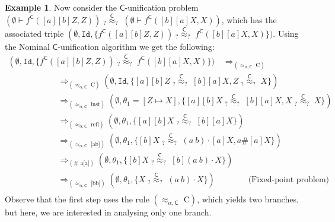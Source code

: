 \documentclass[11pt,a4paper]{amsart}
\newcommand{\caleq}{\approx_{\alpha,\theory{C}}}
\newcommand{\theory}[1]{\ensuremath{\mathsf{#1}}}
\theoremstyle{plain}
\theoremstyle{definition}
\newtheorem{example}{Example}[section]
\theoremstyle{remark}
\begin{document}
\begin{example}
Now consider the \theory{C}-unification problem 
$(\emptyset\vdash f^\theory{C}([a][b]Z,Z)) \; _?{\overset{\theory{C}}{\approx}}_? \; (\emptyset\vdash  f^\theory{C}([b][a]X,X))$,
which has the associated triple $(\emptyset, \mathtt{Id}, \{f^\theory{C}([a][b]Z,Z)) \; _?{\overset{\theory{C}}{\approx}}_? \; f^\theory{C}([b][a]X,X)\})$. 
Using the Nominal \theory{C}-unification algorithm we get the following:
{\small
$$
\begin{array}{l}
    (\emptyset, \mathtt{Id}, \{f^\theory{C}([a][b]Z,Z)) \; _?{\overset{\theory{C}}{\approx}}_? \; f^\theory{C}([b][a]X,X)\}) \quad \Longrightarrow_{(\caleq \text{\ C})} \\ 
    \qquad \qquad  \qquad \Longrightarrow_{(\caleq \text{\ C})}  (\emptyset, \mathtt{Id}, \{[a][b]Z \; _?{\overset{\theory{C}}{\approx}}_? \; [b][a]X, Z \; _?{\overset{\theory{C}}{\approx}}_? \; X\}) \\
    \qquad \qquad \qquad \Longrightarrow_{(\caleq \text{\ inst})}  (\emptyset, \theta_1 = [Z\mapsto X], \{[a][b]X \; _?{\overset{\theory{C}}{\approx}}_? \; [b][a]X, X \; _?{\overset{\theory{C}}{\approx}}_? \; X\})  \\
    \qquad \qquad \qquad \Longrightarrow_{(\caleq \text{\ refl})}  (\emptyset, \theta_1, \{[a][b]X \; _?{\overset{\theory{C}}{\approx}}_? \; [b][a]X \}) \\
    \qquad \qquad \qquad \Longrightarrow_{(\caleq \text{\ [ab]})}  (\emptyset, \theta_1, \{[b]X \; _?{\overset{\theory{C}}{\approx}}_? \; (a\ b)\cdot[a]X, a\# [a]X \}) \\
    \qquad \qquad \qquad \Longrightarrow_{(\# \text{\ a[a]})}  (\emptyset, \theta_1, \{[b]X \; _?{\overset{\theory{C}}{\approx}}_? \; [b](a\ b)\cdot X \}) \\
    \qquad \qquad \qquad \Longrightarrow_{(\caleq \text{\ [bb]})}  (\emptyset, \theta_1, \{X \; _?{\overset{\theory{C}}{\approx}}_? \; (a\ b)\cdot X \}) \qquad\qquad \text{(Fixed-point problem)} \\
\end{array}
$$
}
Observe that the first step uses the rule $(\caleq \text{\ C})$, which yields two branches, but here, we are interested in analysing only one branch.


\end{example}
\end{document}
